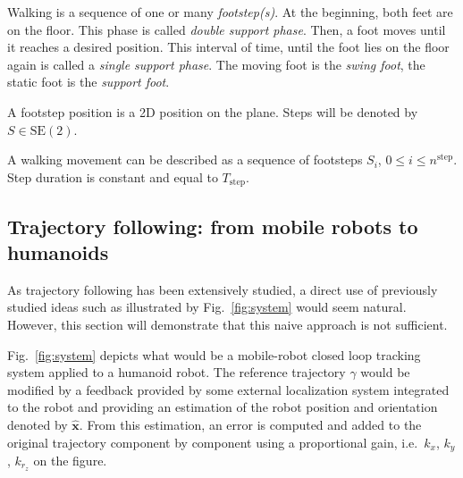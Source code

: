 Walking is a sequence of one or many \emph{footstep(s)}. At the
beginning, both feet are on the floor. This phase is called
\emph{double support phase}. Then, a foot moves until it reaches a
desired position. This interval of time, until the foot lies on the
floor again is called a \emph{single support phase}. The moving foot
is the \emph{swing foot}, the static foot is the \emph{support foot}.

A footstep position is a 2D position on the plane. Steps will be
denoted by \mbox{$S \in \text{SE}(2)$}.

A walking movement can be described as a sequence of footsteps $S_i$,
\mbox{$0 \leq i \leq n^{\text{step}}$}. Step duration is constant and equal
to $T_{\text{step}}$.


\subsection{Trajectory following: from mobile robots to humanoids}


As trajectory following has been extensively studied, a direct use of
previously studied ideas such as illustrated by Fig.~\ref{fig:system}
would seem natural. However, this section will demonstrate that this
naive approach is not sufficient.


Fig.~\ref{fig:system} depicts what would be a mobile-robot closed loop
tracking system applied to a humanoid robot. The reference trajectory
$\gamma$ would be modified by a feedback provided by some external
localization system integrated to the robot and providing an
estimation of the robot position and orientation denoted by
$\hat{\mathbf{x}}$. From this estimation, an error is computed and
added to the original trajectory component by component using a
proportional gain, i.e.\ $k_x$, $k_y$, $k_{r_z}$ on the figure.


